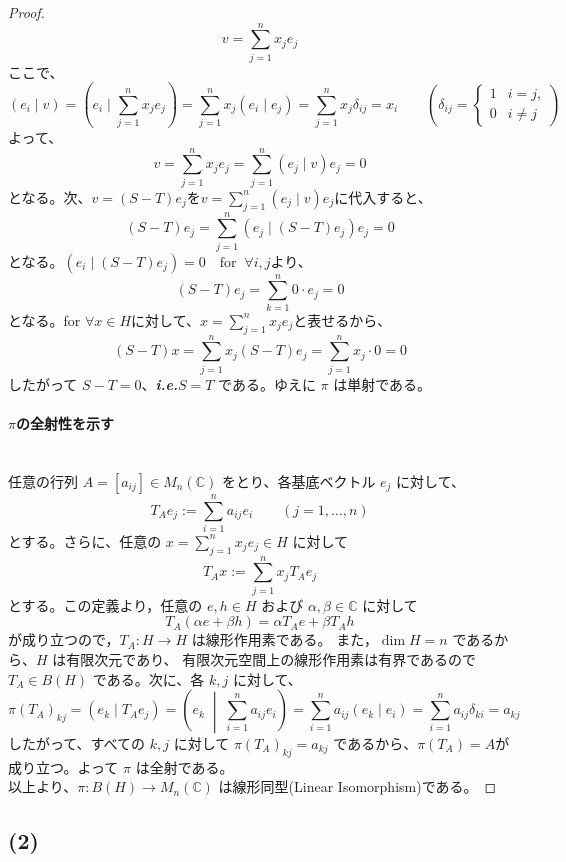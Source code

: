 \documentclass[dvipdfmx,a4paper]{jsarticle}
\makeatletter
\newcommand*{\ie}{\textbf{\textit{i.e.}}\@\xspace}
\theoremstyle{mystyle}
\makeatother
\begin{document}
\begin{proof}
\[
  v=\sum_{j=1}^n x_j e_j
\]
ここで、
$$ 
  (e_i\mid v) = (e_i\mid \sum_{j=1}^n x_j e_j) = \sum_{j=1}^n x_j (e_i\mid e_j) =\sum_{j=1}^n x_j \delta_{ij} = x_i\qquad (\delta_{ij}=\begin{cases}1 & i=j,\\0 & i\ne j\end{cases})
$$
よって、
$$ 
  v = \sum_{j=1}^n x_j e_j = \sum_{j=1}^n (e_j\mid v) e_j = 0
$$
となる。次、$v = (S-T)e_j$を$ v=\sum_{j=1}^n (e_j\mid v) e_j$に代入すると、\\
$$
  (S-T)e_j = \sum_{j=1}^n (e_j\mid (S-T)e_j) e_j = 0
$$
となる。$(e_i\mid (S-T)e_j) = 0\quad \textrm{for }\ \forall i,j$より、
$$ 
  (S-T)e_j = \sum_{k=1}^n 0 \cdot e_j = 0
$$
となる。for $\forall x \in H$に対して、$x = \sum_{j=1}^n x_j e_j$と表せるから、
\[
  (S-T)x=\sum_{j=1}^n x_j (S-T)e_j= \sum_{j=1}^n x_j\cdot 0 =0
\]
したがって $S-T=0$、\ie $S=T$ である。ゆえに $\pi$ は単射である。

\vspace{0.8em}
\noindent
\paragraph{\textbf{$\pi$の全射性}を示す}\ \\
\noindent
任意の行列 $A = [a_{ij}] \in M_n(\mathbb{C})$ をとり、各基底ベクトル $e_j$ に対して、
\[
  T_A e_j := \sum_{i=1}^{n} a_{ij} e_i \qquad (j = 1, \ldots, n)
\]
とする。さらに、任意の $x=\sum_{j=1}^n x_je_j\in H$ に対して
\[
  T_Ax:=\sum_{j=1}^n x_j T_Ae_j
\]
とする。この定義より，任意の $e,h\in H$ および $\alpha,\beta\in\mathbb{C}$ に対して
\[
  T_A(\alpha e+\beta h)=\alpha T_Ae+\beta T_Ah
\]
が成り立つので，$T_A:H\to H$ は線形作用素である。
また，$\dim H=n$ であるから、$H$ は有限次元であり、
有限次元空間上の線形作用素は有界であるので $T_A\in B(H)$ である。次に、各 $k, j$ に対して、
\[
  \pi(T_A)_{kj}
  =(e_k \mid T_A e_j)
  = \left(e_k \;\middle|\; \sum_{i=1}^{n} a_{ij} e_i\right)
  = \sum_{i=1}^{n} a_{ij} (e_k \mid e_i)
  = \sum_{i=1}^{n} a_{ij} \delta_{ki}
  = a_{kj}
\]
したがって、すべての $k,j$ に対して $\pi(T_A)_{kj}=a_{kj}$ であるから、$\pi(T_A)=A$が成り立つ。よって $\pi$ は全射である。\\
\noindent
以上より、$\pi : B(H) \to M_n(\mathbb{C})$ は線形同型(Linear Isomorphism)である。
\end{proof}

\vspace{1.5em}

\subsection*{\textbf{(2)}}
\end{document}
